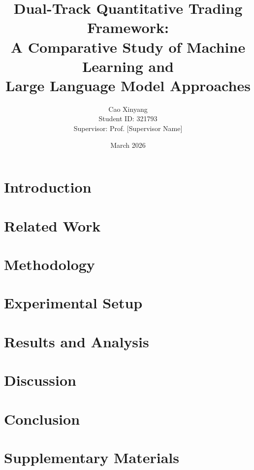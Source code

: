 \documentclass[12pt, a4paper, oneside]{report}
\title{
    \textbf{Dual-Track Quantitative Trading Framework:}\\
    \textbf{A Comparative Study of Machine Learning and\\Large Language Model Approaches}
}
\author{Cao Xinyang\\[0.5cm]
    \small Student ID: 321793\\[0.3cm]
    \small Supervisor: Prof. [Supervisor Name]
}
\date{March 2026}
\begin{document}
\maketitle

\begin{abstract}

\end{abstract}

\tableofcontents
\listoffigures
\listoftables

\chapter{Introduction}


\chapter{Related Work}


\chapter{Methodology}


\chapter{Experimental Setup}


\chapter{Results and Analysis}


\chapter{Discussion}


\chapter{Conclusion}


\printbibliography[heading=bibintoc, title={References}]

\appendix
\chapter{Supplementary Materials}

\end{document}
